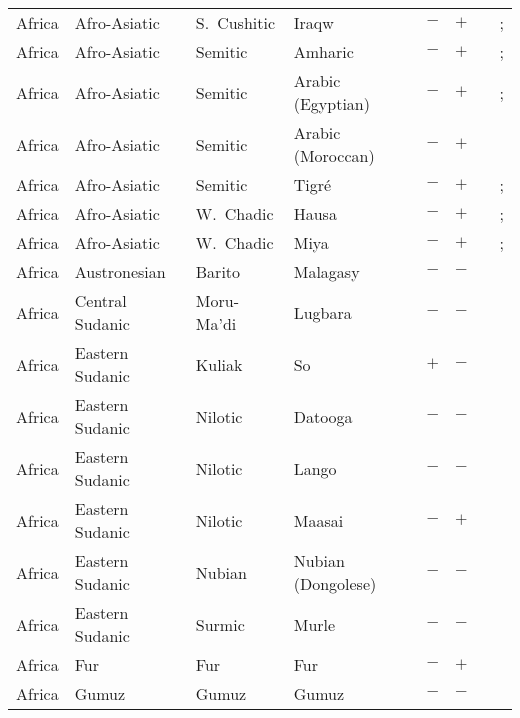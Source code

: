 \begin{landscape}
\begin{longtable}{l>{\raggedright\arraybackslash}p{2.2cm}>{\raggedright}p{2.5cm}>{\raggedright\arraybackslash}p{2.5cm}cc>{\raggedright\arraybackslash}p{3.4cm}>{\raggedright\arraybackslash}p{3.4cm}}
Africa & Afro-Asiatic & S.~Cushitic & Iraqw & $-$ & $+$ & \citealt{Gil2013} & \citealt{Corbett2013}; \citealt[41]{Mous1992}\\
Africa & Afro-Asiatic & Semitic & Amharic & $-$ & $+$ & \citealt{Gil2013} & \citealt{Corbett2013}; \citealt[33--34]{Leslau1995}\\
Africa & Afro-Asiatic & Semitic & Arabic (Egyptian) & $-$ & $+$ & \citealt{Gil2013} & \citealt{Corbett2013}; \citealt[12--18]{Hanna1967}\\
Africa & Afro-Asiatic & Semitic & Arabic (Moroccan) & $-$ & $+$ & \citealt{Gil2013} & \citealt[40, 45--46, 95--97]{Harrell1962}\\
Africa & Afro-Asiatic & Semitic & Tigré & $-$ & $+$ & \citealt[110--112]{Elias2005}& \citealt{Corbett2013}; \citealt[210--216]{Elias2005}\\
Africa & Afro-Asiatic & W.~Chadic & Hausa & $-$ & $+$ & \citealt{Gil2013} & \citealt{Corbett2013}; \citealt[47]{Schuh1976}\\
Africa & Afro-Asiatic & W.~Chadic & Miya & $-$ & $+$ & \citealt{Gil2013} & \citealt{Corbett2013}; \citealt[171--173]{Schuh1989}\\
Africa & Austronesian & Barito & Malagasy & $-$ & $-$ & \citealt{Gil2013} & \citealt{Corbett2013}\\
Africa & Central Sudanic & Moru-Ma'di & Lugbara & $-$ & $-$ & \citealt{Gil2013} & \citealt[295]{Nichols1992}\\
Africa & Eastern Sudanic & Kuliak & So & $+$ & $-$ & \citealt{Gil2013} & \citealt[73]{Carlin1993}\\
Africa & Eastern Sudanic & Nilotic & Datooga & $-$ & $-$ & \citealt{Gil2013} & \citealt[passim]{Kiessling2007}\\
Africa & Eastern Sudanic & Nilotic & Lango & $-$ & $-$ & \citealt{Gil2013} & \citealt{Corbett2013}\\
Africa & Eastern Sudanic & Nilotic & Maasai & $-$ & $+$ & \citealt{Gil2013} & \citealt[160]{Payne1998}\\
Africa & Eastern Sudanic & Nubian & Nubian (Dongolese) & $-$ & $-$ & \citealt{Gil2013} & \citealt{Corbett2013}\\
Africa & Eastern Sudanic & Surmic & Murle & $-$ & $-$ & \citealt[100]{Arensen1982}& \citealt{Corbett2013}\\
Africa & Fur & Fur & Fur & $-$ & $+$ & \citealt{Gil2013} & \citealt[84, 99--115]{Jakobi1990}\\
Africa & Gumuz & Gumuz & Gumuz & $-$ & $-$ & \citealt[131--135]{Ahland2012}& \citealt[95--96]{Ahland2012}\\

\end{longtable}
\end{landscape}
